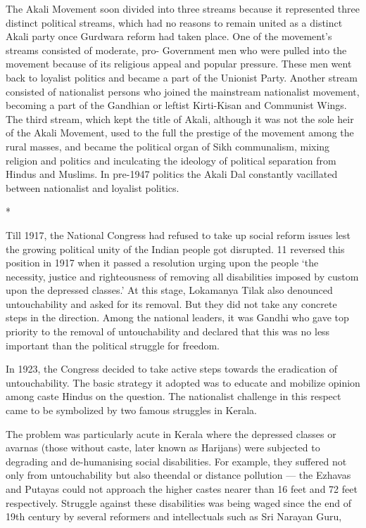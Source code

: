 The Akali Movement soon divided into three streams because it represented three distinct political streams, which had no reasons to remain united as a distinct Akali party once Gurdwara reform had taken place. One of the movement’s streams consisted of moderate, pro- Government men who were pulled into the movement because of its religious appeal and popular pressure. These men went back to loyalist politics and became a part of the Unionist Party. Another stream consisted of nationalist persons who joined the mainstream nationalist movement, becoming a part of the Gandhian or leftist Kirti-Kisan and Communist Wings. The third stream, which kept the title of Akali, although it was not the sole heir of the Akali Movement, used to the full the prestige of the movement among the rural masses, and became the political organ of Sikh communalism, mixing religion and politics and inculcating the ideology of political separation from Hindus and Muslims. In pre-1947 politics the Akali Dal constantly vacillated between nationalist and loyalist politics.

\begin{center}*\end{center}



Till 1917, the National Congress had refused to take up social reform issues lest the growing political unity of the Indian people got disrupted. 11 reversed this position in 1917 when it passed a resolution urging upon the people ‘the necessity, justice and righteousness of removing all disabilities imposed by custom upon the depressed classes.’ At this stage, Lokamanya Tilak also denounced untouchability and asked for its removal. But they did not take any concrete steps in the direction. Among the national leaders, it was Gandhi who gave top priority to the removal of untouchability and declared that this was no less important than the political struggle for freedom.

In 1923, the Congress decided to take active steps towards the eradication of untouchability. The basic strategy it adopted was to educate and mobilize opinion among caste Hindus on the question. The nationalist challenge in this respect came to be symbolized by two famous struggles in Kerala.

The problem was particularly acute in Kerala where the depressed classes or avarnas (those without caste, later known as Harijans) were subjected to degrading and de-humanising social disabilities. For example, they suffered not only from untouchability but also theendal or distance pollution — the Ezhavas and Putayas could not approach the higher castes nearer than 16 feet and 72 feet respectively. Struggle against these disabilities was being waged since the end of 19th century by several reformers and intellectuals such as Sri Narayan Guru,

